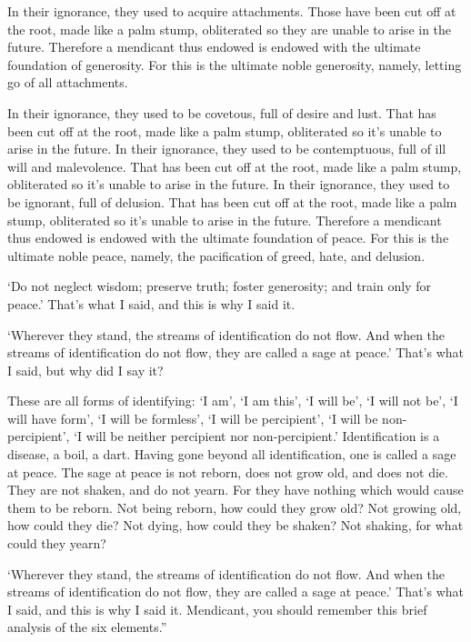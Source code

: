 \documentclass[12pt,openany]{book}%
\begin{document}
In their ignorance, they used to acquire attachments. Those have been cut off at the root, made like a palm stump, obliterated so they are unable to arise in the future. Therefore a mendicant thus endowed is endowed with the ultimate foundation of generosity. For this is the ultimate noble generosity, namely, letting go of all attachments. 

In their ignorance, they used to be covetous, full of desire and lust. That has been cut off at the root, made like a palm stump, obliterated so it’s unable to arise in the future. In their ignorance, they used to be contemptuous, full of ill will and malevolence. That has been cut off at the root, made like a palm stump, obliterated so it’s unable to arise in the future. In their ignorance, they used to be ignorant, full of delusion. That has been cut off at the root, made like a palm stump, obliterated so it’s unable to arise in the future. Therefore a mendicant thus endowed is endowed with the ultimate foundation of peace. For this is the ultimate noble peace, namely, the pacification of greed, hate, and delusion. 

‘Do not neglect wisdom; preserve truth; foster generosity; and train only for peace.’ That’s what I said, and this is why I said it. 

‘Wherever they stand, the streams of identification do not flow. And when the streams of identification do not flow, they are called a sage at peace.’ That’s what I said, but why did I say it? 

These are all forms of identifying: ‘I am’, ‘I am this’, ‘I will be’, ‘I will not be’, ‘I will have form’, ‘I will be formless’, ‘I will be percipient’, ‘I will be non-percipient’, ‘I will be neither percipient nor non-percipient.’ Identification is a disease, a boil, a dart. Having gone beyond all identification, one is called a sage at peace. The sage at peace is not reborn, does not grow old, and does not die. They are not shaken, and do not yearn. For they have nothing which would cause them to be reborn. Not being reborn, how could they grow old? Not growing old, how could they die? Not dying, how could they be shaken? Not shaking, for what could they yearn? 

‘Wherever they stand, the streams of identification do not flow. And when the streams of identification do not flow, they are called a sage at peace.’ That’s what I said, and this is why I said it. Mendicant, you should remember this brief analysis of the six elements.” 
\end{document}
